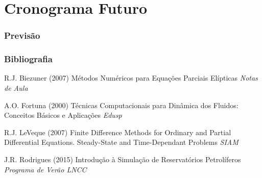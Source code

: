 \documentclass{beamer}
\begin{document}
\section{Cronograma Futuro}

\begin{frame}
  \frametitle{Previsão}
\end{frame}



\begin{frame}
  \frametitle{Bibliografia}
  \footnotesize{
    \begin{thebibliography}{99} %

       R.J. Biezuner (2007)
      \newblock Métodos Numéricos para Equações Parciais Elípticas
      \newblock \emph{Notas de Aula}

       A.O. Fortuna (2000)
      \newblock Técnicas Computacionais para Dinâmica dos Fluidos: Conceitos Básicos e Aplicações
      \newblock \emph{Edusp}

       R.J. LeVeque (2007)
      \newblock Finite Difference Methods for Ordinary and Partial Differential Equations. Steady-State and Time-Dependant Problems
      \newblock \emph{SIAM}

       J.R. Rodrigues (2015)
      \newblock Introdução à Simulação de Reservatórios Petrolíferos
      \newblock \emph{Programa de Verão LNCC}
    \end{thebibliography}
  }
\end{frame}

\end{document}
